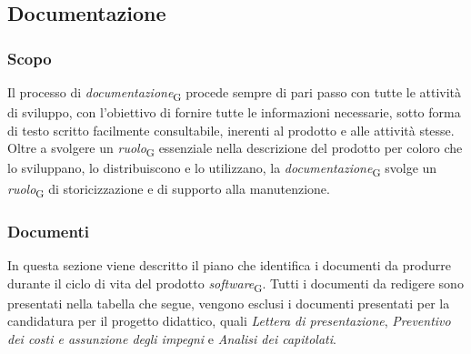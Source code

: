 \subsection{Documentazione}
\subsubsection{Scopo}
Il processo di \textit{documentazione}\textsubscript{G} procede sempre di pari passo con tutte le attività di sviluppo, con l'obiettivo di fornire tutte le informazioni necessarie, sotto forma di testo scritto facilmente consultabile, inerenti al prodotto e alle attività stesse. Oltre a svolgere un \textit{ruolo}\textsubscript{G} essenziale nella descrizione del prodotto per coloro che lo sviluppano, lo distribuiscono e lo utilizzano, la \textit{documentazione}\textsubscript{G} svolge un \textit{ruolo}\textsubscript{G} di storicizzazione e di supporto alla manutenzione. 

\subsubsection{Documenti}
In questa sezione viene descritto il piano che identifica i documenti da produrre durante il ciclo di vita del prodotto \textit{software}\textsubscript{G}. Tutti i documenti da redigere sono presentati nella tabella che segue, vengono esclusi i documenti presentati per la candidatura per il progetto didattico, quali \textit{Lettera di presentazione}, \textit{Preventivo dei costi e assunzione degli impegni} e \textit{Analisi dei capitolati}.


